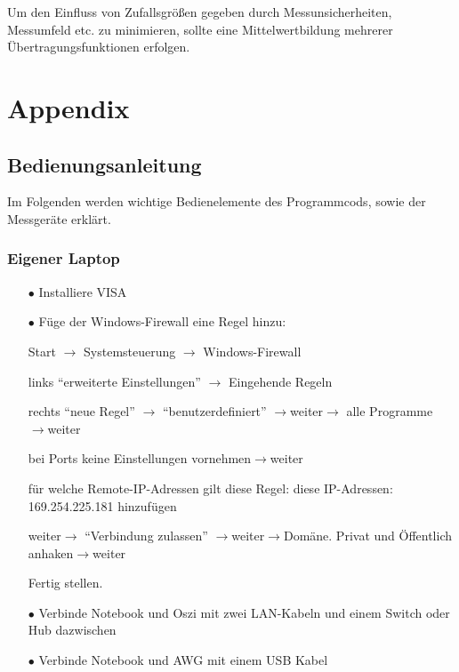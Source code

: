 \documentclass[12pt,report,final,twoside,accentcolor=tud9b,bigchapter]{tudreport}
\begin{document}
Um den Einfluss von Zufallsgrößen gegeben durch Messunsicherheiten, Messumfeld etc. zu minimieren, sollte eine Mittelwertbildung mehrerer Übertragungsfunktionen erfolgen.

\chapter{Appendix}
\label{cha:anhang}
\section{Bedienungsanleitung}
Im Folgenden werden wichtige Bedienelemente des Programmcods, sowie der
Messgeräte erklärt.
\subsection{Eigener Laptop}
\begin{enumerate}
\item[$\bullet$] Installiere VISA \cite{visa}
\item[$\bullet$] Füge der Windows-Firewall eine Regel hinzu:

Start $\rightarrow$ Systemsteuerung $\rightarrow$ Windows-Firewall

 links ``erweiterte Einstellungen''
 $\rightarrow$ Eingehende Regeln 

 rechts ``neue
Regel'' $\rightarrow$ ``benutzerdefiniert'' $\rightarrow$weiter$\rightarrow$ alle Programme $\rightarrow$weiter 


 bei Ports keine Einstellungen
vornehmen$\rightarrow$weiter 

 für welche Remote-IP-Adressen gilt
diese Regel: diese
IP-Adressen: 169.254.225.181 hinzufügen

 weiter$\rightarrow$ ``Verbindung
zulassen'' $\rightarrow$weiter$\rightarrow$Domäne. Privat und Öffentlich
anhaken$\rightarrow$weiter

 Fertig stellen.
\item[$\bullet$] Verbinde Notebook und Oszi mit zwei LAN-Kabeln und
einem Switch oder Hub dazwischen
\item[$\bullet$] Verbinde Notebook und AWG mit einem USB Kabel
\end{enumerate}
\end{document}
